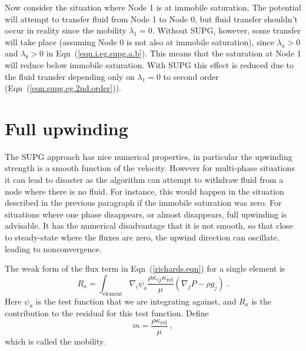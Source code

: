 \documentclass[]{scrreprt}
\begin{document}
Now consider the situation where Node 1 is at immobile saturation.  The
potential will attempt to transfer fluid from Node 1 to Node 0, but
fluid transfer shouldn't occur in reality since the mobility
$\lambda_{1}=0$.  Without SUPG, however, some transfer will take place
(assuming Node 0 is not also at immobile saturation), since
$\lambda_{a}> 0$ and $\lambda_{b}>0$ in
Eqn~(\ref{eqn.i.eg.supg.a.b}).  This means that the saturation at Node
1 will reduce below immobile saturation.  With SUPG this effect is
reduced due to the fluid transfer depending only on $\lambda_{1}=0$ to second
order (Eqn~(\ref{eqn.supg.eg.2nd.order})).


\section{Full upwinding}

The SUPG approach has nice numerical properties, in particular the
upwinding strength is a smooth function of the velocity.  However for
multi-phase situations it can lead to disaster as the algorithm can
attempt to withdraw fluid from a node where there is no fluid.  For
instance, this would happen in the situation described in the previous
paragraph if the immobile saturation was zero.  For situations where
one phase disappears, or almost disappears, full upwinding is
advisable.  It has the numerical disadvantage that it is not smooth,
so that close to steady-state where the fluxes are zero, the upwind
direction can oscillate, leading to nonconvergence.

The weak form of the flux term in Eqn~(\ref{richards.eqn}) for a
single element is
\begin{equation}
R_{a} = \int_{\mathrm{element}} \nabla_{i}\psi_{a}
\frac{\rho\kappa_{ij}\kappa_{\mathrm{rel}}}{\mu}(\nabla_{j}P - \rho
g_{j})  \ .
\end{equation}
Here $\psi_{a}$ is the test function that we are integrating against,
and $R_{a}$ is the contribution to the residual for this test
function.  Define
\begin{equation}
m = \frac{\rho\kappa_{\mathrm{rel}}}{\mu} \ ,
\end{equation}
which is called the mobility.
\end{document}
